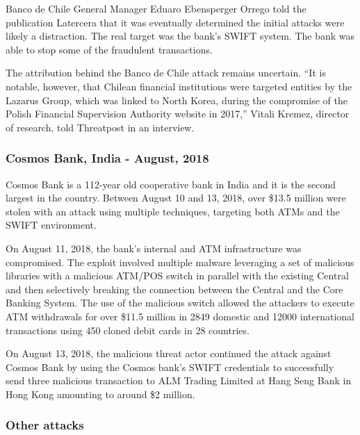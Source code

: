 \documentclass[12pt]{article}
\begin{document}
        Banco de Chile General Manager Eduaro Ebensperger Orrego told the publication Latercera that it was eventually determined the initial attacks were likely a distraction. The real target was the bank's SWIFT system. The bank was able to stop some of the fraudulent transactions. 
        
        The attribution behind the Banco de Chile attack remains uncertain.
        “It is notable, however, that Chilean financial institutions were targeted entities by the Lazarus Group, which was linked to North Korea, during the compromise of the Polish Financial Supervision Authority website in 2017,” Vitali Kremez, director of research, told Threatpost in an interview. 

        \cite{HackersCrashedBank}\cite{BancoChileWiper}\cite{BancoChileLoses}
        
    \subsubsection{Cosmos Bank, India - August, 2018}
        Cosmos Bank is a 112-year old cooperative bank in India and it is the second largest in the country. Between August 10 and 13, 2018, over \$13.5 million were stolen with an attack using multiple techniques, targeting both ATMs and the SWIFT environment. 
        
        On August 11, 2018, the bank’s internal and ATM infrastructure was compromised. The exploit involved multiple malware leveraging a set of malicious libraries with a malicious ATM/POS switch in parallel with the existing Central and then selectively breaking the connection between the Central and the Core Banking System. The use of the malicious switch allowed the attackers to execute ATM withdrawals for over \$11.5 million in 2849 domestic  and 12000 international transactions using 450 cloned debit cards in 28 countries.
        
        On August 13, 2018, the malicious threat actor continued the attack against Cosmos Bank by using the Cosmos bank’s SWIFT credentials to successfully send three malicious transaction to ALM Trading Limited at Hang Seng Bank in Hong Kong amounting to around \$2 million.\cite{CosmosBankSWIFT2018}\cite{PoliceInvestigateCosmos}
        
    \subsubsection*{Other attacks}
        
\end{document}
